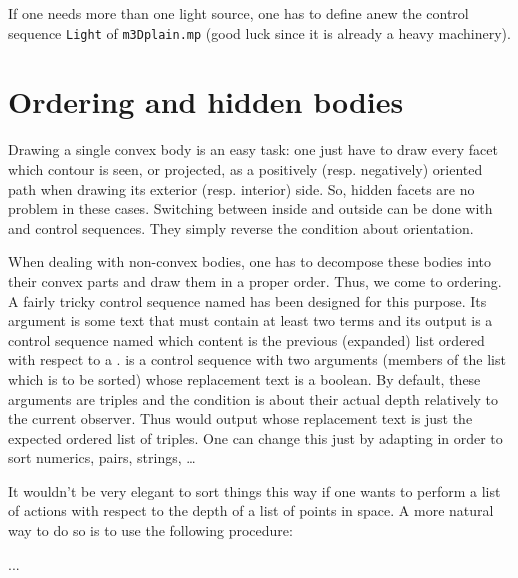 If one needs more than one light source, one has to
define anew the control sequence {\tt Light} of
{\tt m3Dplain.mp} (good luck since it is already
a heavy machinery).

\section{Ordering and hidden bodies}

Drawing a single convex body is an easy task: one just have to draw
every facet which contour is seen, or projected, as a positively
(resp. negatively) oriented path when drawing its exterior (resp.
interior) side. So, hidden facets are no problem in these cases.
Switching between inside and outside can be done with 
and  control sequences. They simply reverse the condition
about orientation.

When dealing with non-convex bodies, one has to decompose these bodies
into their convex parts and draw them in a proper order. Thus, we come
to ordering. A fairly tricky control sequence named 
has been designed for this purpose. Its argument is some text that
must contain at least two terms and its output is a control sequence
named  which content is the previous (expanded) list
ordered with respect to a .
 is a control sequence with two arguments (members of
the list which is to be sorted) whose replacement text is a boolean.
By default, these arguments are triples and the condition is about their
actual depth relatively to the current observer. Thus
 would output 
whose replacement text is just the expected ordered list of triples.
One can change this just by adapting  in order
to sort numerics, pairs, strings, \dots

It wouldn't be very elegant to sort things this way if one wants to perform
a list of actions with respect to the depth of a list of points in space.
A more natural way to do so is to use the following procedure:




...


